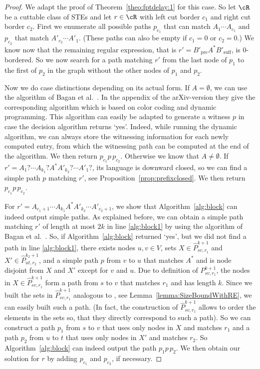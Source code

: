 \documentclass[a4paper,english]{lipics-v2016}
\theoremstyle{plain}
\begin{document}
\fptdelayiii*
\begin{proof}
We adapt the proof of Theorem~\ref{theo:fptdelay:1} for this case. So let $\cR$ be a cuttable class of STEs and let $r \in \cR$ with left cut border $c_1$ and right cut border $c_2$.
First we enumerate all possible paths $p_{c_1}$ that can match $A_1 \cdots A_{c_1}$ and $p_{c_2}$ that match $A'_{c_2} \cdots A'_{1}$. (These paths can also be empty if $c_1 = 0$ or $c_2 = 0$.)
We know now that the remaining regular expression, that is $r' = B'_\text{pre} A^* B'_\text{suff}$, is 0-bordered. So we now search for a path matching $r'$ from the last node of $p_1$ to the first of $p_2$ in the graph without the other nodes of $p_1$ and $p_2$.

Now we do case distinctions depending on its actual form.
If $A = \emptyset$, we can use the algorithm of Bagan et
al.~\cite[Theorem 6]{bagan}. In the appendix of the arXiv-version
\cite{baganOld} they give the corresponding algorithm which is based
on color coding \cite{AlonYZ-jacm95} and dynamic programming. This algorithm
can easily be adapted to generate a witness $p$ in case the decision
algorithm returns `yes'. Indeed, while running the dynamic algorithm,
we can always store the witnessing information for each newly computed
entry, from which the witnessing path can be computed at the end of
the algorithm.
We then return $p_{c_1} p\, p_{c_2}$.
Otherwise we know that $A \neq \emptyset$. If $r' = A_{1}? \cdots A_{k_1}? A^* A'_{k_2}? \cdots A'_{1}?$, its language is downward closed, so we can find a simple path $p$ matching $r'$, see Proposition~\ref{prop:prefixclosed}. We then return $p_{c_1}p\, p_{c_2}$.

For $r' = A_{c_1+1} \cdots A_{k_1} A^* A'_{k_2} \cdots A'_{c_2+1}$, we show that Algorithm~\ref{alg:block} can indeed output simple paths. As explained before, we can obtain a simple path matching $r'$ of length at most $2k$ in line \ref{alg:block1} by using the algorithm of Bagan et
al.~\cite[Theorem 6]{bagan}. 
So, if Algorithm~\ref{alg:block} returned `yes', but we did not find a path in line \ref{alg:block1}, there exists nodes $u, v \in V$, sets $X\in \hat{P}^{k+1}_{sv,r_1}$ and $X'\in \hat{P}^{k_2+1}_{ut,r_2}$, and a simple path $p$ from $v$ to $u$ that matches $A^*$ and is node disjoint from $X$ and $X'$ except for $v$ and $u$. 
Due to definition of $P^{k+1}_{sv,r_1}$,
the nodes in $X\in \hat{P}^{k+1}_{sv,r_1}$ form a path from $s$ to $v$ that matches $r_1$ and has length $k$. Since we built the sets in $\hat{P}^{k+1}_{sv,r_1}$ analogous to \cite[Lemma 5.2]{fomin}, see Lemma~\ref{lemma:SizeBoundWithRE}, we can easily built such a path. (In fact, the construction of $\hat{P}^{k+1}_{sv,r_1}$ allows to order the elements in the sets so, that they directly correspond to such a path).
So we can construct a path $p_1$ from $s$ to $v$ that uses only nodes in $X$ and matches $r_1$ and a path $p_2$ from $u$ to $t$ that uses only nodes in $X'$ and matches $r_2$. 
So Algorithm~\ref{alg:block} can indeed output the path $p_1 p\, p_2$. 
We then obtain our solution for $r$ by adding $p_{c_1}$ and $p_{c_2}$, if necessary.  


\end{proof}
\end{document}
